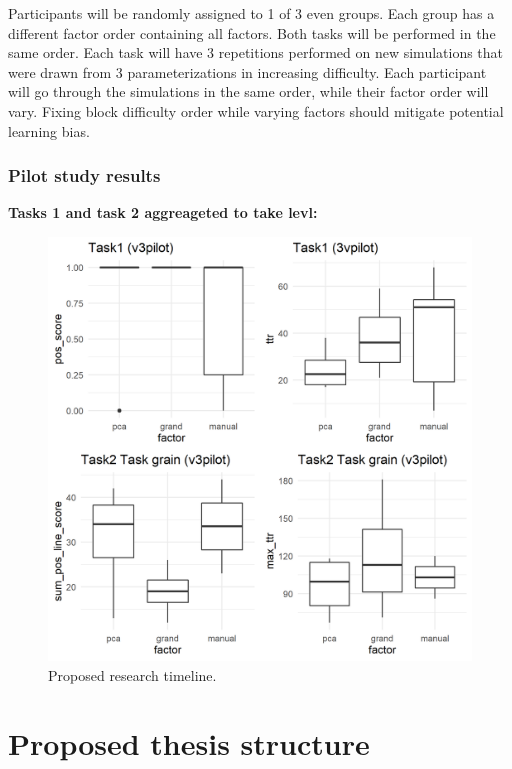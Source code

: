 \documentclass[
  11,
]{article}
\begin{document}
Participants will be randomly assigned to 1 of 3 even groups. Each group has a different factor order containing all factors. Both tasks will be performed in the same order. Each task will have 3 repetitions performed on new simulations that were drawn from 3 parameterizations in increasing difficulty. Each participant will go through the simulations in the same order, while their factor order will vary. Fixing block difficulty order while varying factors should mitigate potential learning bias.

\hypertarget{pilot-study-results}{%
\subsubsection{Pilot study results}\label{pilot-study-results}}

\textbf{Tasks 1 and task 2 aggreageted to take levl:}

\begin{figure}[h]

{\centering \includegraphics[width=1\linewidth,]{figures/v3pilot} 

}

\caption{Proposed research timeline.}\label{fig:v3pilot}
\end{figure}

\hypertarget{proposed-thesis-structure}{%
\section{Proposed thesis structure}\label{proposed-thesis-structure}}
\end{document}
